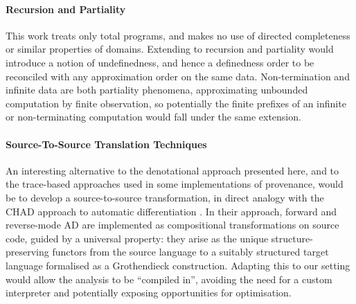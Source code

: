 \paragraph{Recursion and Partiality}  This work treats only total programs, and makes no use of directed completeness or similar
properties of domains. Extending to recursion and partiality would introduce a notion of undefinedness, and
hence a definedness order to be reconciled with any approximation order on the same data. Non-termination and
infinite data are both partiality phenomena, approximating unbounded computation by finite observation, so
potentially the finite prefixes of an infinite or non-terminating computation would fall under the same
extension.

\paragraph{Source-To-Source Translation Techniques}


An interesting alternative to the denotational approach presented here, and to the trace-based approaches used
in some implementations of provenance, would be to develop a
source-to-source transformation, in direct analogy with
the CHAD approach to automatic differentiation \cite{vakar22,nunes2023}. In their approach, forward and
reverse-mode AD are implemented as compositional transformations on source code, guided by a universal
property: they arise as the unique structure-preserving functors from the source language to a suitably
structured target language formalised as a Grothendieck construction. Adapting this to our setting
would allow the analysis to be ``compiled in'', avoiding the need for
a custom interpreter and potentially exposing opportunities for optimisation.

